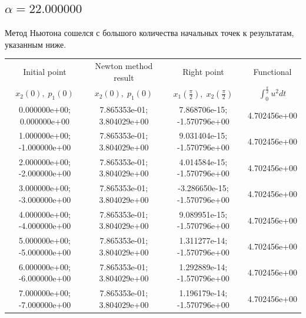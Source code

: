 \documentclass[titlepage]{article}
\def\l{\left}
\def\r{\right}
\begin{document}
\subsection{$\alpha = 22.000000$} 
Метод Ньютона сошелся с большого количества начальных точек к результатам, указанным ниже. \\ 
\begin{tabular}{ | c | c | c | c |} 
\hline 
Initial point  & Newton method result & Right point & Functional 
 \\ $x_2(0), \; p_1(0)$ & $x_2(0), \; p_1(0)$ & $x_1\l(\frac{\pi}{2}\r), \; x_2\l(\frac{\pi}{2}\r)$ & $\int_{0}^{\frac{\pi}{2}}u^2dt$  \\ \hline 
0.000000e+00; 0.000000e+00 & 7.865353e-01; 3.804029e+00 & 7.868706e-15; -1.570796e+00 & 4.702456e+00 \\ \hline 
1.000000e+00; -1.000000e+00 & 7.865353e-01; 3.804029e+00 & 9.031404e-15; -1.570796e+00 & 4.702456e+00 \\ \hline 
2.000000e+00; -2.000000e+00 & 7.865353e-01; 3.804029e+00 & 4.014584e-15; -1.570796e+00 & 4.702456e+00 \\ \hline 
3.000000e+00; -3.000000e+00 & 7.865353e-01; 3.804029e+00 & -3.286650e-15; -1.570796e+00 & 4.702456e+00 \\ \hline 
4.000000e+00; -4.000000e+00 & 7.865353e-01; 3.804029e+00 & 9.089951e-15; -1.570796e+00 & 4.702456e+00 \\ \hline 
5.000000e+00; -5.000000e+00 & 7.865353e-01; 3.804029e+00 & 1.311277e-14; -1.570796e+00 & 4.702456e+00 \\ \hline 
6.000000e+00; -6.000000e+00 & 7.865353e-01; 3.804029e+00 & 1.292889e-14; -1.570796e+00 & 4.702456e+00 \\ \hline 
7.000000e+00; -7.000000e+00 & 7.865353e-01; 3.804029e+00 & 1.196179e-14; -1.570796e+00 & 4.702456e+00 \\ \hline 
\end{tabular} 
\end{document}
